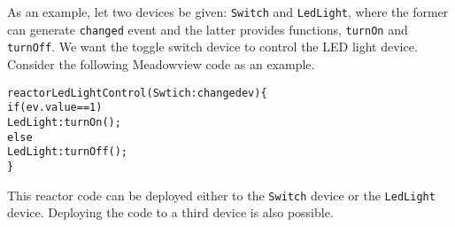 \documentclass{note}
\begin{document}
As an example, let two devices be given: \textcolor{red2}{\texttt{Switch}} and 
\textcolor{red2}{\texttt{LedLight}}, where the former can generate
\textcolor{red2}{\texttt{changed}} event 
and the latter provides functions, 
\textcolor{red2}{\texttt{turnOn}} and 
\textcolor{red2}{\texttt{turnOff}}.
We want the toggle switch device to control the LED light device.
Consider the following Meadowview code as an example.
\begin{alltt}
  \textcolor{red2}{reactor LedLightControl(Swtich:changed ev) \{
    if (ev.value == 1)
      LedLight:turnOn();
    else
      LedLight:turnOff();
  \}}
\end{alltt}
This reactor code can be deployed either to the
\textcolor{red2}{\texttt{Switch}} device 
or the \textcolor{red2}{\texttt{LedLight}} device. Deploying the code to a
third device is also possible.
\end{document}
